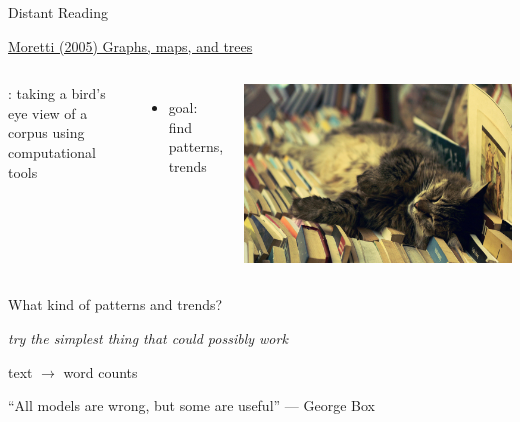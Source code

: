 \documentclass[aspectratio=169,usenames,dvipsnames]{beamer}
\begin{document}
\begin{frame}{Distant Reading}
\begin{reference}
\href{https://www.versobooks.com/books/261-graphs-maps-trees}{
Moretti (2005) Graphs, maps, and trees}

\end{reference}
\begin{columns}
        \begin{definition}
        :
        taking a bird's eye view of a corpus using computational tools
        \end{definition}
    \begin{itemize}
        \item goal: find patterns, trends
    \end{itemize}
    \onslide
    \includegraphics[width=\linewidth]{fig/catbooks.jpg}
\end{columns}
\end{frame}


\begin{frame}{What kind of patterns and trends?}

	\emph{try the simplest thing that could possibly work}\texttrademark

	\pause
	\vspace{2em}
	\centering
	text $\rightarrow$ word counts

    \pause
    \vspace{2em}
    ``All models are wrong, but some are useful'' --- George Box
\end{frame}
\end{document}
